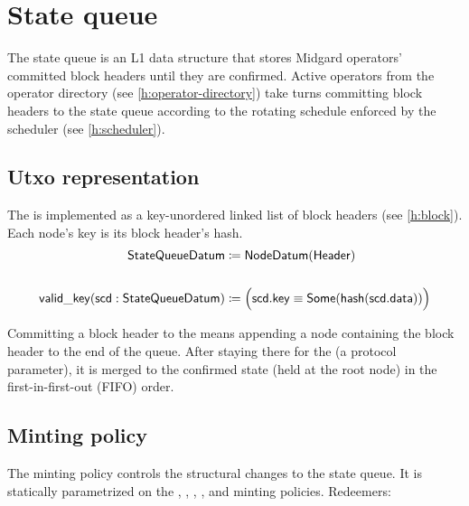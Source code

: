 \documentclass[../midgard.tex]{subfiles}
\begin{document}
\section{State queue}
\label{h:state-queue}

The state queue is an L1 data structure that stores Midgard operators' committed block headers until they are confirmed. Active operators from the operator directory (see \cref{h:operator-directory}) take turns committing block headers to the state queue according to the rotating schedule enforced by the scheduler (see \cref{h:scheduler}).

\subsection{Utxo representation}
\label{h:state-queue-utxo-representation}

The  is implemented as a key-unordered linked list of block headers (see \cref{h:block}). Each  node's key is its block header's hash.
\begin{align*}
    \mathsf{StateQueueDatum} &\coloneq \mathsf{NodeDatum}(\mathsf{Header}) \\ \\
    \mathsf{valid\_key}(\mathsf{scd} : \mathsf{StateQueueDatum}) &\coloneq
        \Bigl( \mathsf{scd.key} \equiv \mathsf{Some}(\mathsf{hash}(\mathsf{scd.data})) \Bigr)
\end{align*}

Committing a block header to the  means appending a node containing the block header to the end of the queue. After staying there for the  (a protocol parameter), it is merged to the confirmed state (held at the  root node) in the first-in-first-out (FIFO) order.

\subsection{Minting policy}
\label{h:state-queue-minting-policy}

The  minting policy controls the structural changes to the state queue. It is statically parametrized on the , , , , and  minting policies. Redeemers:
\end{document}

